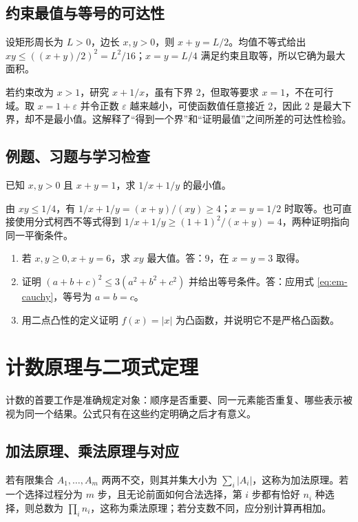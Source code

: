 \documentclass[UTF8]{ctexbook}
\begin{document}
\section{约束最值与等号的可达性}
设矩形周长为 $L>0$，边长 $x,y>0$，则 $x+y=L/2$。均值不等式给出 $xy\le((x+y)/2)^2=L^2/16$；$x=y=L/4$ 满足约束且取等，所以它确为最大面积。

若约束改为 $x>1$，研究 $x+1/x$，虽有下界 $2$，但取等要求 $x=1$，不在可行域。取 $x=1+\varepsilon$ 并令正数 $\varepsilon$ 越来越小，可使函数值任意接近 $2$，因此 $2$ 是最大下界，却不是最小值。这解释了“得到一个界”和“证明最值”之间所差的可达性检验。

\section{例题、习题与学习检查}
\begin{example}
已知 $x,y>0$ 且 $x+y=1$，求 $1/x+1/y$ 的最小值。
\end{example}
\begin{solve}
由 $xy\le1/4$，有 $1/x+1/y=(x+y)/(xy)\ge4$；$x=y=1/2$ 时取等。也可直接使用分式柯西不等式得到 $1/x+1/y\ge(1+1)^2/(x+y)=4$，两种证明指向同一平衡条件。
\end{solve}
\begin{enumerate}
\item 若 $x,y\ge0,x+y=6$，求 $xy$ 最大值。答：$9$，在 $x=y=3$ 取得。
\item 证明 $(a+b+c)^2\le3(a^2+b^2+c^2)$ 并给出等号条件。答：应用式 \eqref{eq:em-cauchy}，等号为 $a=b=c$。
\item 用二点凸性的定义证明 $f(x)=|x|$ 为凸函数，并说明它不是严格凸函数。
\end{enumerate}

\chapter{计数原理与二项式定理}
\label{chap:em-counting}
计数的首要工作是准确规定对象：顺序是否重要、同一元素能否重复、哪些表示被视为同一个结果。公式只有在这些约定明确之后才有意义。

\section{加法原理、乘法原理与对应}
若有限集合 $A_1,\ldots,A_m$ 两两不交，则其并集大小为 $\sum_i|A_i|$，这称为加法原理。若一个选择过程分为 $m$ 步，且无论前面如何合法选择，第 $i$ 步都有恰好 $n_i$ 种选择，则总数为 $\prod_i n_i$，这称为乘法原理；若分支数不同，应分别计算再相加。
\end{document}
